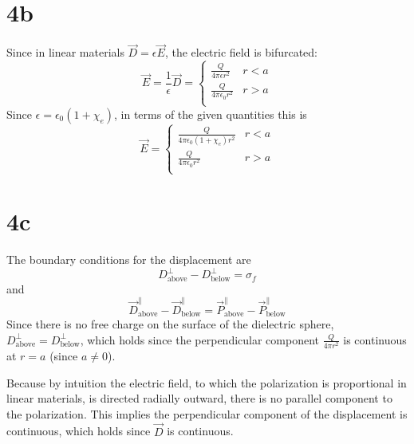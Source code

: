 \documentclass{article}
\begin{document}
\section*{4b}
Since in linear materials $\vec{D}=\epsilon\vec{E}$, the electric field is bifurcated:
\[\vec{E}=\frac{1}{\epsilon}\vec{D}=\begin{cases}
    \frac{Q}{4\pi\epsilon r^2} & r < a \\
    \frac{Q}{4\pi\epsilon_0r^2} & r > a \\
  \end{cases}\]
Since $\epsilon=\epsilon_0(1+\chi_e)$, in terms of the given quantities this is
\[\vec{E}=\begin{cases}
    \frac{Q}{4\pi\epsilon_0(1+\chi_e)r^2} & r < a \\
    \frac{Q}{4\pi\epsilon_0 r^2} & r > a\\
  \end{cases}\]

\section*{4c}
The boundary conditions for the displacement are \[D_{\textrm{above}}^\perp-D_{\textrm{below}}^\perp=\sigma_f\] and
\[\vec{D}_{\textrm{above}}^\parallel-\vec{D}_{\textrm{below}}^\parallel=\vec{P}_{\textrm{above}}^\parallel-\vec{P}_{\textrm{below}}^\parallel\]Since there is no free charge on the surface of the dielectric sphere, $D_{\textrm{above}}^\perp=D_{\textrm{below}}^\perp$, which holds since the perpendicular component $\frac{Q}{4\pi r^2}$ is continuous at $r=a$ (since $a\neq 0$).

Because by intuition the electric field, to which the polarization is proportional in linear materials, is directed radially outward, there is no parallel component to the polarization. This implies the perpendicular component of the displacement is continuous, which holds since $\vec{D}$ is continuous.
\end{document}
